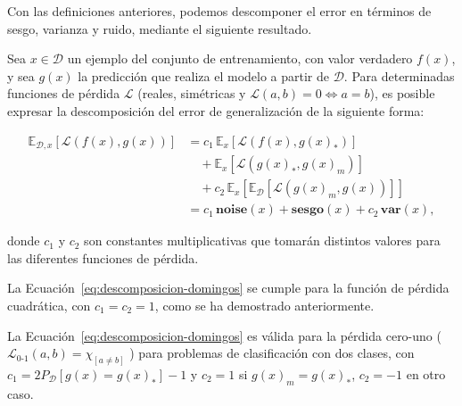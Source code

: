 Con las definiciones anteriores, podemos descomponer el error en términos de sesgo, varianza y ruido, mediante el siguiente resultado.

\begin{definicion}
    Sea $x \in \mathcal{D}$ un ejemplo del conjunto de entrenamiento, con valor verdadero $f(x)$, y sea $g(x)$ la predicción que realiza el modelo a partir de $\mathcal{D}$. Para determinadas funciones de pérdida $\mathcal{L}$ (reales, simétricas y $\mathcal{L}(a,b) = 0 \Leftrightarrow a = b$), es posible expresar la descomposición del error de generalización de la siguiente forma:

    \begin{equation}\label{eq:descomposicion-domingos}
        \begin{aligned}
        \mathbb{E}_{\mathcal{D}, x}[\mathcal{L}(f(x), g(x))] 
        &= c_1 \, \mathbb{E}_{x}[\mathcal{L}(f(x), g(x)_{*})] \\
        &\quad + \mathbb{E}_{x}[\mathcal{L}(g(x)_{*}, g(x)_{m})] \\
        &\quad + c_2 \, \mathbb{E}_{x}[\mathbb{E}_{\mathcal{D}}[\mathcal{L}(g(x)_{m}, g(x))]] \\
        &= c_1 \, \textbf{noise}(x) + \textbf{sesgo}(x) + c_2 \, \textbf{var}(x),
        \end{aligned}
        \end{equation}

    donde $c_1$ y $c_2$ son constantes multiplicativas que tomarán distintos valores para las diferentes funciones de pérdida.
\end{definicion}

\begin{observacion}
    La Ecuación~\eqref{eq:descomposicion-domingos} se cumple para la función de pérdida cuadrática, con $c_1 = c_2 = 1$, como se ha demostrado anteriormente.
\end{observacion}

\begin{teorema}
    La Ecuación~\eqref{eq:descomposicion-domingos} es válida para la pérdida cero-uno ($\mathcal{L}_{0\text{-}1}(a, b) = \chi_{[a \neq b]}$
    ) para problemas de clasificación con dos clases, con $c_1 = 2P_\mathcal{D}[g(x) = g(x)_*] - 1$ y $c_2 = 1$ si $g(x)_m = g(x)_*$, $c_2 = -1$ en otro caso.
\end{teorema}

